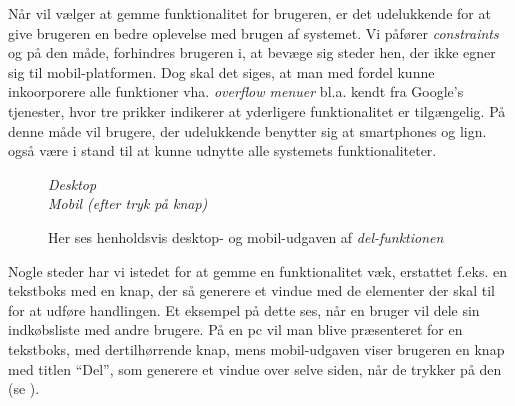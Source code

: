 Når vil vælger at gemme funktionalitet for brugeren, er det udelukkende for at give brugeren en bedre oplevelse med brugen af systemet.
Vi påfører \textit{constraints} og på den måde, forhindres brugeren i, at bevæge sig steder hen, der ikke egner sig til mobil-platformen.
Dog skal det siges, at man med fordel kunne inkoorporere alle funktioner vha. \textit{overflow menuer} bl.a. kendt fra Google's tjenester, hvor tre prikker indikerer at yderligere funktionalitet er tilgængelig.
På denne måde vil brugere, der udelukkende benytter sig at smartphones og lign. også være i stand til at kunne udnytte alle systemets funktionaliteter.

\begin{figure}
\vspace{-30pt}
\begin{center}
\textit{Desktop}
\\
\vspace{10pt}
\textit{Mobil (efter tryk på knap)}
\end{center}
\vspace{-10pt}
\caption{Her ses henholdsvis desktop- og mobil-udgaven af \textit{del-funktionen}}\label{ss:share_diffs}
\vspace{-30pt}
\end{figure}
Nogle steder har vi istedet for at gemme en funktionalitet væk, erstattet f.eks. en tekstboks med en knap, der så generere et vindue med de elementer der skal til for at udføre handlingen. 
Et eksempel på dette ses, når en bruger vil dele sin indkøbsliste med andre brugere.
På en pc vil man blive præsenteret for en tekstboks, med dertilhørrende knap, mens mobil-udgaven viser brugeren en knap med titlen ``Del'', som generere et vindue over selve siden, når de trykker på den (se  ).

